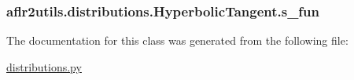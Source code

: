 \hypertarget{classaflr2utils_1_1distributions_1_1HyperbolicTangent_a73e6bc6017220b4a5b32c178122814dc}{
\subsubsection[{s\-\_\-fun}]{\setlength{\rightskip}{0pt plus 5cm}aflr2utils.\-distributions.\-Hyperbolic\-Tangent.\-s\-\_\-fun}}\label{classaflr2utils_1_1distributions_1_1HyperbolicTangent_a73e6bc6017220b4a5b32c178122814dc}


The documentation for this class was generated from the following file\-:\begin{DoxyCompactItemize}
\item 
\hyperlink{distributions_8py}{distributions.\-py}\end{DoxyCompactItemize}

